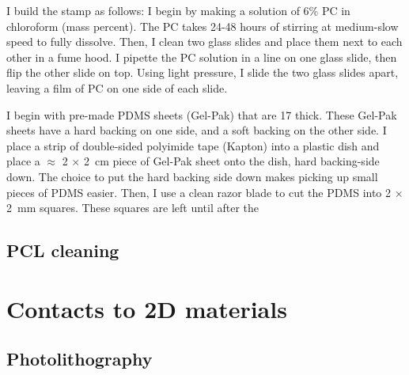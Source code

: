 \documentclass[double,12pt,1in]{beavtex}
\begin{document}
I build the stamp as follows: I begin by making a solution of 6\% PC in chloroform (mass percent). The PC takes 24-48 hours of stirring at medium-slow speed to fully dissolve. Then, I clean two glass slides and place them next to each other in a fume hood. I pipette the PC solution in a line on one glass slide, then flip the other slide on top. Using light pressure, I slide the two glass slides apart, leaving a film of PC on one side of each slide.

I begin with pre-made PDMS sheets (Gel-Pak) that are \SI{17}{\mil} thick. These Gel-Pak sheets have a hard backing on one side, and a soft backing on the other side. I place a strip of double-sided polyimide tape (Kapton) into a plastic dish and place a $\approx$ 2 $\times$ \SI{2}{\centi\meter} piece of Gel-Pak sheet onto the dish, hard backing-side down. The choice to put the hard backing side down makes picking up small pieces of PDMS easier. Then, I use a clean razor blade to cut the PDMS into  2 $\times$ \SI{2}{mm} squares. These squares are left until after the 


\subsection{PCL cleaning}

\section{Contacts to 2D materials}

\subsection{Photolithography}
\end{document}
